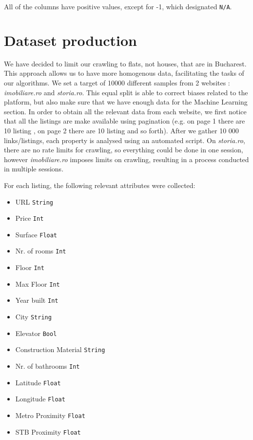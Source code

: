 \documentclass{article}
\begin{document}
All of the columns have positive values, except for -1, which designated \texttt{N/A}.

\section{Dataset production}
We have decided to limit our crawling to flats, not houses, that are in Bucharest. This approach allows us to have more homogenous data, facilitating the tasks of our algorithms.
 We set a target of 10000 different samples from 2 websites : \emph{imobiliare.ro} and \emph{storia.ro}. This equal split is able to correct biases related to the platform, but also make sure that we have enough data for the Machine Learning section. In order to obtain all the relevant data from each website, we first notice that all the listings are make available using pagination (e.g. on page 1 there are 10 listing , on page 2 there are 10 listing and so forth). After we gather 10 000 links/listings, each property is analysed using an automated script. On \emph{storia.ro}, there are no rate limits for crawling, so everything could be done in one session, however \emph{imobiliare.ro} imposes limits on crawling, resulting in a process conducted in multiple sessions.

 For each listing, the following relevant attributes were collected:

\begin{itemize}
    \bfseries
    \item URL \texttt{String}
    \item Price \texttt{Int}
    \item Surface \texttt{Float}
    \item Nr. of rooms \texttt{Int}
    \item Floor \texttt{Int}
    \item Max Floor \texttt{Int}
    \item Year built \texttt{Int}
    \item City \texttt{String}
    \item Elevator \texttt{Bool}
    \item Construction Material \texttt{String}
    \item Nr. of bathrooms \texttt{Int}
    \item Latitude \texttt{Float}
    \item Longitude \texttt{Float}
    \item Metro Proximity \texttt{Float}
    \item STB Proximity \texttt{Float}
\end{itemize}
 
\end{document}
